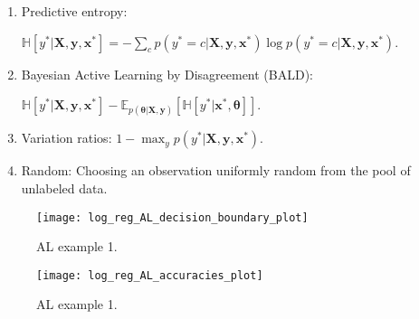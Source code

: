 \begin{enumerate}
  \item Predictive entropy:

  $ \mathbb{H} \left[ y^* | \boldsymbol{X}, \boldsymbol{y}, \boldsymbol{x}^* \right] = - \sum_c p(y^* = c | \boldsymbol{X}, \boldsymbol{y}, \boldsymbol{x}^*) \log p(y^* = c | \boldsymbol{X}, \boldsymbol{y}, \boldsymbol{x}^*)$.

  \item Bayesian Active Learning by Disagreement (BALD):

  $ \mathbb{H} \left[ y^* | \boldsymbol{X}, \boldsymbol{y}, \boldsymbol{x}^* \right] - \mathbb{E}_{p(\boldsymbol{\theta} | \boldsymbol{X}, \boldsymbol{y})} \left[ \mathbb{H} \left[ y^* | \boldsymbol{x}^*, \boldsymbol{\theta} \right] \right]$.

  \item Variation ratios: $1 - \max_y p(y^* | \boldsymbol{X}, \boldsymbol{y}, \boldsymbol{x}^*)$.

  \item Random: Choosing an observation uniformly random from the pool of unlabeled data.

\end{enumerate}



\begin{figure}[H]
    \centering
    \texttt{[image: log\_reg\_AL\_decision\_boundary\_plot]}
    \caption{AL example 1.}
    \label{fig:log_reg_AL_decision_boundary_plot}
\end{figure}



\begin{figure}[H]
    \centering
    \texttt{[image: log\_reg\_AL\_accuracies\_plot]}
    \caption{AL example 1.}
    \label{fig:log_reg_AL_accuracies_plot}
\end{figure}
